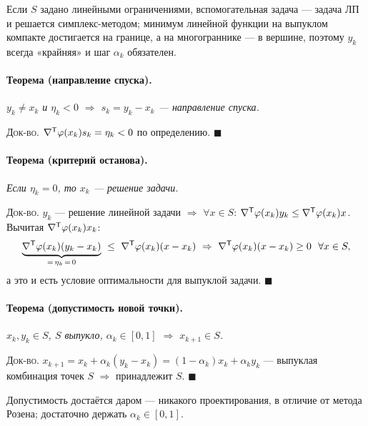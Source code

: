 Если $S$ задано линейными ограничениями, вспомогательная задача — задача ЛП и
решается симплекс-методом; минимум линейной функции на выпуклом компакте
достигается на границе, а на многограннике — в вершине, поэтому $y_k$ всегда
«крайняя» и шаг $\alpha_k$ обязателен.

\paragraph{Теорема (направление спуска).}
\textit{$y_k \ne x_k$ и $\eta_k < 0$ $\Rightarrow$ $s_k = y_k - x_k$ —
направление спуска.}

\textsc{Док-во.} $\nabla^{\mathsf{T}}\varphi(x_k)s_k = \eta_k < 0$ по определению.
$\blacksquare$

\paragraph{Теорема (критерий останова).}
\textit{Если $\eta_k = 0$, то $x_k$ — решение задачи.}

\textsc{Док-во.} $y_k$ — решение линейной задачи $\Rightarrow$
$\forall x \in S$:
$\nabla^{\mathsf{T}}\varphi(x_k)y_k \le \nabla^{\mathsf{T}}\varphi(x_k)x$. Вычитая
$\nabla^{\mathsf{T}}\varphi(x_k)x_k$:
\[
  \underbrace{\nabla^{\mathsf{T}}\varphi(x_k)(y_k - x_k)}_{=\,\eta_k\,=\,0}
  \ \le\ \nabla^{\mathsf{T}}\varphi(x_k)(x - x_k)
  \ \Rightarrow\ \nabla^{\mathsf{T}}\varphi(x_k)(x - x_k) \ge 0 \ \ \forall x \in S ,
\]
а это и есть условие оптимальности для выпуклой задачи. $\blacksquare$

\paragraph{Теорема (допустимость новой точки).}
\textit{$x_k, y_k \in S$, $S$ выпукло, $\alpha_k \in [0,1]$ $\Rightarrow$
$x_{k+1} \in S$.}

\textsc{Док-во.}
$x_{k+1} = x_k + \alpha_k(y_k - x_k) = (1-\alpha_k)x_k + \alpha_k y_k$ —
выпуклая комбинация точек $S$ $\Rightarrow$ принадлежит $S$. $\blacksquare$

Допустимость достаётся даром — никакого проектирования, в отличие от метода
Розена; достаточно держать $\alpha_k \in [0,1]$.

